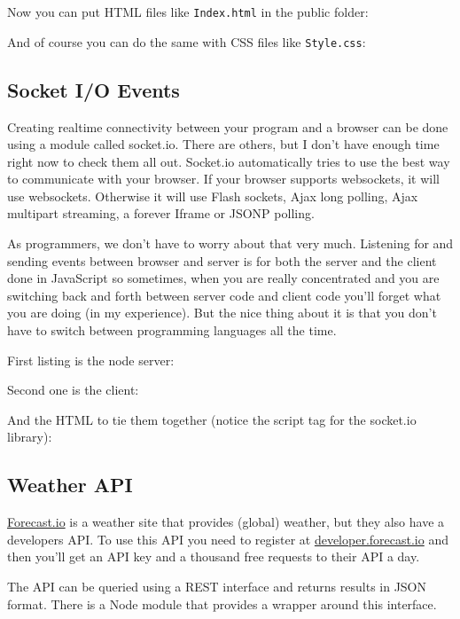 \documentclass[a4paper]{report}
\begin{document}
\noindent Now you can put HTML files like \texttt{Index.html} in the public folder:


\noindent And of course you can do the same with CSS files like \texttt{Style.css}:


\subsection*{Socket I/O Events}
Creating realtime connectivity between your program and a browser can be done using a module called socket.io. There are others, but I don't have enough time right now to check them all out. Socket.io automatically tries to use the best way to communicate with your browser. If your browser supports websockets, it will use websockets. Otherwise it will use Flash sockets, Ajax long polling, Ajax multipart streaming, a forever Iframe or JSONP polling.

As programmers, we don't have to worry about that very much. Listening for and sending events between browser and server is for both the server and the client done in JavaScript so sometimes, when you are really concentrated and you are switching back and forth between server code and client code you'll forget what you are doing (in my experience). But the nice thing about it is that you don't have to switch between programming languages all the time.

First listing is the node server:


\noindent Second one is the client:


\noindent And the HTML to tie them together (notice the script tag for the socket.io library):


\subsection*{Weather API}
\href{http://forecast.io/}{Forecast.io} is a weather site that provides (global) weather, but they also have a developers API. To use this API you need to register at \href{https://developer.forecast.io/}{developer.forecast.io} and then you'll get an API key and a thousand free requests to their API a day.

The API can be queried using a REST interface and returns results in JSON format. There is a Node module that provides a wrapper around this interface.
\end{document}
